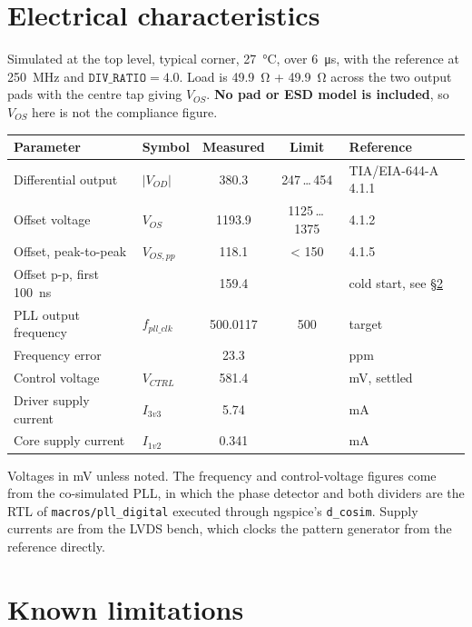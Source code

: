 \documentclass[a4paper,10pt]{article}
\begin{document}
\section{Electrical characteristics}

Simulated at the top level, typical corner, \SI{27}{\celsius}, over
\SI{6}{\micro\second}, with the reference at \SI{250}{\mega\hertz} and
$\mathtt{DIV\_RATIO} = 4.0$. Load is \SI{49.9}{\ohm} + \SI{49.9}{\ohm} across
the two output pads with the centre tap giving $V_{OS}$. \textbf{No pad or ESD
model is included}, so $V_{OS}$ here is not the compliance figure.

\begin{center}
\begin{tabular}{@{}l l S S l@{}}
\toprule
\textbf{Parameter} & \textbf{Symbol} & {\textbf{Measured}} & {\textbf{Limit}} & \textbf{Reference} \\
\midrule
Differential output   & $|V_{OD}|$      & 380.3 & {247\,\ldots\,454} & TIA/EIA-644-A 4.1.1 \\
Offset voltage        & $V_{OS}$        & 1193.9 & {1125\,\ldots\,1375} & 4.1.2 \\
Offset, peak-to-peak  & $V_{OS,pp}$     & 118.1 & {< 150} & 4.1.5 \\
Offset p-p, first \SI{100}{\nano\second} & & 159.4 & {} & cold start, see \S\ref{sec:limits} \\
\addlinespace
PLL output frequency  & $f_{pll\_clk}$  & 500.0117 & {500} & target \\
Frequency error       &                 & 23.3 & {} & ppm \\
Control voltage       & $V_{CTRL}$      & 581.4 & {} & mV, settled \\
\addlinespace
Driver supply current & $I_{3v3}$       & 5.74 & {} & mA \\
Core supply current   & $I_{1v2}$       & 0.341 & {} & mA \\
\bottomrule
\end{tabular}
\end{center}

\noindent
Voltages in \si{\milli\volt} unless noted. The frequency and control-voltage
figures come from the co-simulated PLL, in which the phase detector and both
dividers are the RTL of \texttt{macros/pll\_digital} executed through ngspice's
\texttt{d\_cosim}. Supply currents are from the LVDS bench, which clocks the
pattern generator from the reference directly.

\section{Known limitations}\label{sec:limits}
\end{document}
